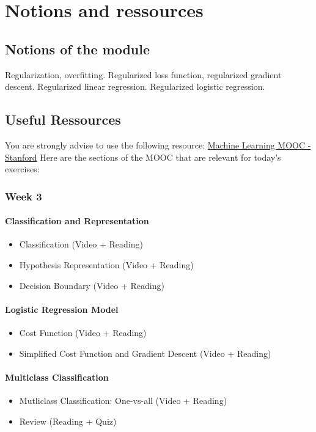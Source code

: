 

\chapter*{Notions and ressources}

\section*{Notions of the module}
Regularization, overfitting. Regularized loss function, regularized gradient descent.  
Regularized linear regression. Regularized logistic regression.

\section*{Useful Ressources}

You are strongly advise to use the following resource:
\href{https://www.coursera.org/learn/machine-learning/home/week/3}{Machine Learning MOOC - Stanford}
Here are the sections of the MOOC that are relevant for today's exercises: 

\subsection*{Week 3}

\subsubsection*{Classification and Representation}
\begin{itemize}
  \item Classification (Video + Reading)
  \item Hypothesis Representation (Video + Reading)
  \item Decision Boundary (Video + Reading)
\end{itemize}

\subsubsection*{Logistic Regression Model}
\begin{itemize}
  \item Cost Function (Video + Reading)
  \item Simplified Cost Function and Gradient Descent (Video + Reading)
\end{itemize}

\subsubsection*{Multiclass Classification}
\begin{itemize}
  \item Mutliclass Classification: One-vs-all (Video + Reading)
  \item Review (Reading + Quiz)
\end{itemize}
